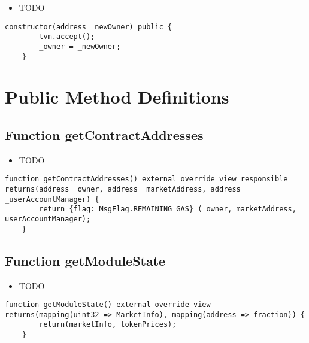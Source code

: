 \noindent\begin{itemize}
\item TODO
\end{itemize}

\begin{lstlisting}[firstnumber=20]
    constructor(address _newOwner) public {
        tvm.accept();
        _owner = _newOwner;
    }
\end{lstlisting}

\section{Public Method Definitions}


\subsection{Function getContractAddresses}

\noindent\begin{itemize}
\item TODO
\end{itemize}

\begin{lstlisting}[firstnumber=79]
    function getContractAddresses() external override view responsible returns(address _owner, address _marketAddress, address _userAccountManager) {
        return {flag: MsgFlag.REMAINING_GAS} (_owner, marketAddress, userAccountManager);
    }
\end{lstlisting}

\subsection{Function getModuleState}

\noindent\begin{itemize}
\item TODO
\end{itemize}

\begin{lstlisting}[firstnumber=63]
    function getModuleState() external override view returns(mapping(uint32 => MarketInfo), mapping(address => fraction)) {
        return(marketInfo, tokenPrices);
    }
\end{lstlisting}


